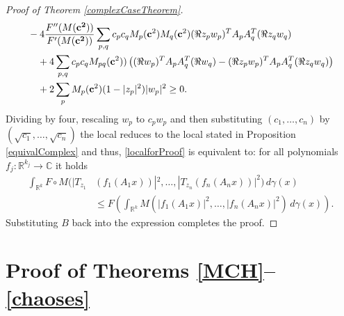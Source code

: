 \documentclass[9pt, a4paper]{amsart}
\newcommand{\R}{\mathbb{R}}
\newcommand{\C}{\mathbb{C}}
\newcommand{\1}{{\chi_{}}}%
\numberwithin{equation}{section}
\begin{document}
\begin{proof}[Proof of Theorem \ref{complexCaseTheorem}]
\begin{align*}
&-4\frac{F''(M(\bf{c}^2))}{F'(M(\bf{c}^2))}\sum_{p,q} 
c_pc_qM_{p}({\bf{c}}^2)M_{q}({\bf{c}}^2) (\Re z_{p} w_{p})^{T}A_{p}A_{q}^{T}(\Re z_{q} w_{q}) \\
&\quad+4\sum_{p,q}  c_pc_qM_{pq}({\bf{c}}^2))\left((\Re w_{p})^{T}A_{p}A_{q}^{T}(\Re w_{q})  - (\Re z_{p} w_{p})^{T}A_{p}A_{q}^{T}(\Re z_{q} w_{q})\right) \\
&\quad+2\sum_{p}M_p({\bf{c}}^2)  (1-|z_p|^2)|w_{p}|^2\geq0.
\end{align*}
Dividing by four, rescaling $w_p$ to $c_pw_p$ and then substituting $(c_1,\ldots,c_n)$ by $(\sqrt{c_1},\ldots,\sqrt{c_n})$ the local reduces to the local stated in Proposition \ref{equivalComplex} and thus, \eqref{localforProof} is equivalent to: for all polynomials $f_j:\R^{k_j}\to\C$ it holds
\vspace{0.2cm}
\begin{align*}
\int_{\R^k}F\circ M(|T_{z_1}&(f_1(A_1 x))|^2, \ldots, |T_{z_n}(f_n( A_n x))|^2) \,d\gamma(x)\\
&\leq F\left(	\int_{\R^k}M(|f_1(A_1 x)|^2, \ldots, |f_n(A_n x)|^2)\,d\gamma(x)\right).
\end{align*}  
Substituting $B$ back into the expression completes the proof.
\end{proof}




\section{\textbf{Proof of Theorems \ref{MCH}--\ref{chaoses}}}\label{proofsFROMcomplex}
\end{document}
